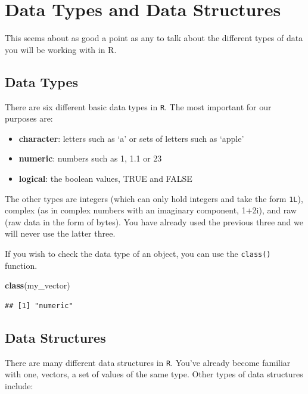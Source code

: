 \documentclass[
]{book}
\newenvironment{Shaded}{\begin{snugshade}}{\end{snugshade}}
\newcommand{\FunctionTok}[1]{\textcolor[rgb]{0.13,0.29,0.53}{\textbf{#1}}}
\newcommand{\NormalTok}[1]{#1}
\providecommand{\tightlist}{%
  \setlength{\itemsep}{0pt}\setlength{\parskip}{0pt}}
\begin{document}
\hypertarget{data-types-and-data-structures}{%
\section{Data Types and Data Structures}\label{data-types-and-data-structures}}

This seems about as good a point as any to talk about the different types of data you will be working with in R.

\hypertarget{data-types}{%
\subsection{Data Types}\label{data-types}}

There are six different basic data types in \texttt{R}. The most important for our purposes are:

\begin{itemize}
\tightlist
\item
  \textbf{character}: letters such as `a' or sets of letters such as `apple'
\item
  \textbf{numeric}: numbers such as 1, 1.1 or 23
\item
  \textbf{logical}: the boolean values, TRUE and FALSE
\end{itemize}

The other types are integers (which can only hold integers and take the form \texttt{1L}), complex (as in complex numbers with an imaginary component, 1+2i), and raw (raw data in the form of bytes). You have already used the previous three and we will never use the latter three.

If you wish to check the data type of an object, you can use the \texttt{class()} function.

\begin{Shaded}
\begin{Highlighting}[]
\FunctionTok{class}\NormalTok{(my\_vector)}
\end{Highlighting}
\end{Shaded}

\begin{verbatim}
## [1] "numeric"
\end{verbatim}

\hypertarget{data-structures}{%
\subsection{Data Structures}\label{data-structures}}

There are many different data structures in \texttt{R}. You've already become familiar with one, vectors, a set of values of the same type. Other types of data structures include:
\end{document}

